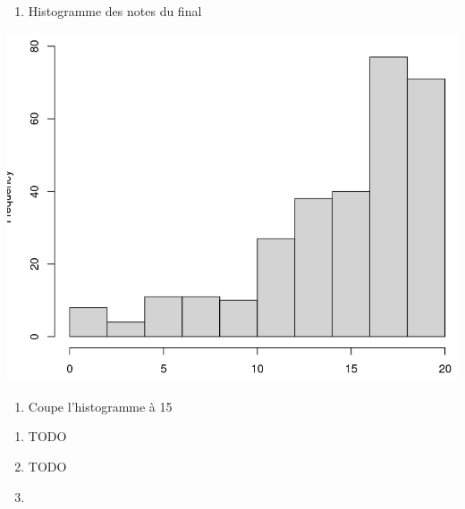 \documentclass[
]{article}
\newenvironment{Shaded}{}{}
\newcommand{\DataTypeTok}[1]{\textcolor[rgb]{0.56,0.13,0.00}{#1}}
\newcommand{\DecValTok}[1]{\textcolor[rgb]{0.25,0.63,0.44}{#1}}
\newcommand{\KeywordTok}[1]{\textcolor[rgb]{0.00,0.44,0.13}{\textbf{#1}}}
\newcommand{\NormalTok}[1]{#1}
\newcommand{\OperatorTok}[1]{\textcolor[rgb]{0.40,0.40,0.40}{#1}}
\providecommand{\tightlist}{%
  \setlength{\itemsep}{0pt}\setlength{\parskip}{0pt}}
\begin{document}
\begin{enumerate}
\def\labelenumi{\arabic{enumi}.}
\setcounter{enumi}{24}
\tightlist
\item
  Histogramme des notes du final
\end{enumerate}

\begin{Shaded}
\end{Shaded}

\includegraphics{img/hist(final).png}

\begin{enumerate}
\def\labelenumi{\arabic{enumi}.}
\setcounter{enumi}{25}
\tightlist
\item
  Coupe l'histogramme à 15
\end{enumerate}

\begin{Shaded}
\end{Shaded}

\begin{enumerate}
\def\labelenumi{\arabic{enumi}.}
\setcounter{enumi}{26}
\item
  TODO
\item
  TODO
\item
\end{enumerate}
\end{document}
